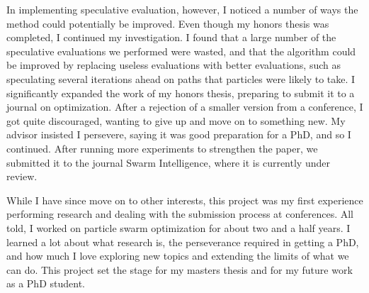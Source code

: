 \documentclass[onecolumn, 12pt]{article}
\begin{document}
In implementing speculative evaluation, however, I noticed a number of ways the
method could potentially be improved.  Even though my honors thesis was
completed, I continued my investigation.  I found that a large number of the
speculative evaluations we performed were wasted, and that the algorithm could
be improved by replacing useless evaluations with better evaluations, such as
speculating several iterations ahead on paths that particles were likely to
take.  I significantly expanded the work of my honors thesis, preparing to
submit it to a journal on optimization.  After a rejection of a smaller version
from a conference, I got quite discouraged, wanting to give up and move on to
something new.  My advisor insisted I persevere, saying it was good
preparation for a PhD, and so I continued.  After running more experiments to
strengthen the paper, we submitted it to the journal Swarm Intelligence, where
it is currently under review.

While I have since move on to other interests, this project was my first
experience performing research and dealing with the submission process at
conferences.  All told, I worked on particle swarm optimization for about two
and a half years.  I learned a lot about what research is, the perseverance
required in getting a PhD, and how much I love exploring new topics and
extending the limits of what we can do.  This project set the stage for my
masters thesis and for my future work as a PhD student.  
\end{document}
